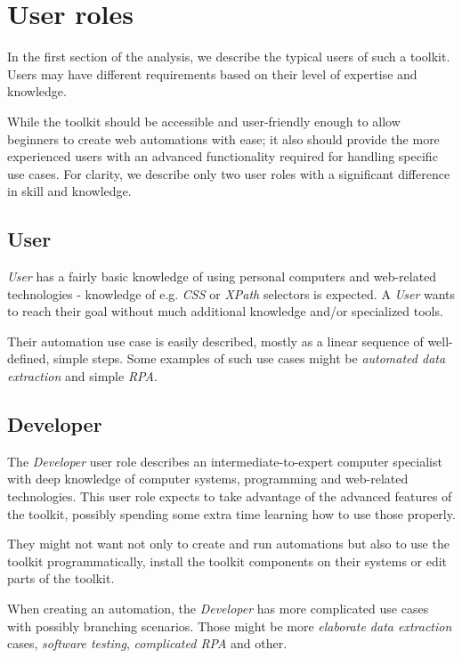 \section{User roles} \label{userroles}

In the first section of the analysis, we describe the typical users of such a toolkit.
Users may have different requirements based on their level of expertise and knowledge.

While the toolkit should be accessible and user-friendly enough to allow beginners to
create web automations with ease; it also should provide the more experienced users with 
an advanced functionality required for handling specific use cases. 
For clarity, we describe only two user roles with a significant difference in skill and knowledge. 

\subsection{User} \label{UserUserRole}
\textit{User} has a fairly basic knowledge of using personal computers 
and web-related technologies - knowledge of e.g. \textit{CSS} or \textit{XPath} selectors is expected.
A \textit{User} wants to reach their goal without much additional knowledge and/or specialized tools.

Their automation use case is easily described, mostly as a linear sequence of well-defined, simple steps.
Some examples of such use cases might be \textit{automated data extraction} and simple \textit{\acl{RPA}}.


\subsection{Developer} \label{DevUserRole}
The \textit{Developer} user role describes an intermediate-to-expert computer specialist with deep
knowledge of computer systems, programming and web-related technologies.
This user role expects to take advantage of the advanced features of the toolkit, possibly spending some extra time learning how to use those properly.

They might not want not only to create and run automations but also to use the toolkit programmatically, 
install the toolkit components on their systems or edit parts of the toolkit. 

When creating an automation, the \textit{Developer} has more complicated use cases with possibly branching scenarios. 
Those might be more \textit{elaborate data extraction} cases, \textit{software testing}, \textit{complicated \ac{RPA}} and other.
